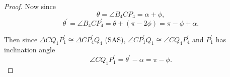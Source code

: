 \documentclass{ximera}
\begin{document}
\begin{proof}
Now since 
\[
    \theta =  \angle B_4 C P_4 = \alpha+\phi ,
\]
\[
     \theta^\prime = \angle B_4 C P_4^\prime =  \theta+ (\pi - 2\phi) = \pi -\phi + \alpha .
\]

Then since $\Delta CQ_1P_1^\prime \cong \Delta CP_4^\prime Q_4$ (SAS), $\angle CP_1^\prime Q_1 \cong \angle CQ_4P_4^\prime$ and $P_1^\prime$ has inclination angle 
\[
     \angle CQ_1P_1^\prime = \theta^\prime - \alpha = \pi - \phi.
\]







\end{proof}
\end{document}
